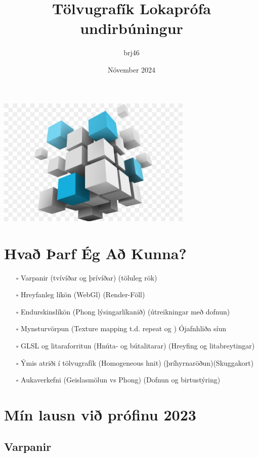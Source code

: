 \documentclass{article}
\title{Tölvugrafík Lokaprófa undirbúningur}
\author{brj46 }
\date{Nóvember 2024}
\begin{document}
\maketitle

\vspace {7em}
\begin{center}
\includegraphics[width=0.7\textwidth]{myndir/3d.jpg}
\end{center}

\newpage
\section*{Hvað Þarf Ég Að Kunna?}

\begin{itemize}
    \item[$\square$] Varpanir (tvívíðar og þrívíðar) (töluleg rök)
    \item[$\square$] Hreyfanleg líkön (WebGl) (Render-Föll)
    \item[$\square$] Endurskinslíkön (Phong lýsingarlíkanið) (útreikningar með dofnun)
    \item[$\square$] Mynsturvörpun (Texture mapping t.d. repeat og ) Ójafnhliða síun
    \item[$\square$] GLSL og litaraforritun (Hnúta- og bútalitarar) (Hreyfing og litabreytingar)
    \item[$\square$] Ýmis atriði í tölvugrafík (Homogeneous hnit) (þríhyrnaröðun)(Skuggakort)
    \item[$\square$] Aukaverkefni (Geislasmölun vs Phong) (Dofnun og birtustýring)
\end{itemize}

\newpage

\section{Mín lausn við prófinu 2023}

\subsection{Varpanir}
\end{document}
